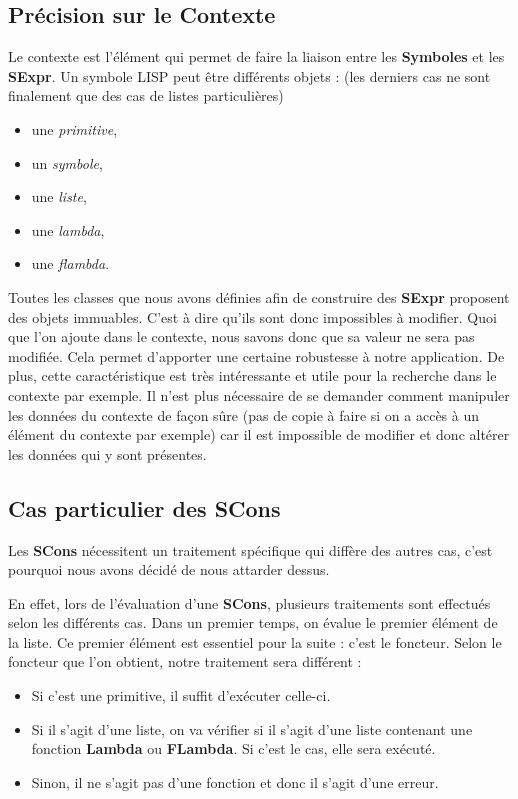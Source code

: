 \documentclass[a4paper, 11pt]{article}
\numberwithin{equation}{section}
\theoremstyle{definition}
\begin{document}
\subsection{Précision sur le Contexte}

Le contexte est l'élément qui permet de faire la liaison entre les {\bfseries Symboles} et les {\bfseries SExpr}.\newline
Un symbole LISP peut être différents objets : (les derniers cas ne sont finalement que des cas de listes particulières)\newline
\begin{itemize}
	\item une \textit{primitive},
	\item un \textit{symbole},
	\item une \textit{liste},
	\item une \textit{lambda},
	\item une \textit{flambda}.
	\newline
\end{itemize}
Toutes les classes que nous avons définies afin de construire des {\bfseries SExpr} proposent des objets immuables. C'est à dire qu'ils sont donc impossibles à modifier. Quoi que l'on ajoute dans le contexte, nous savons donc que sa valeur ne sera pas modifiée. Cela permet d'apporter une certaine robustesse à notre application. De plus, cette caractéristique est très intéressante et utile pour la recherche dans le contexte par exemple. Il n'est plus nécessaire de se demander comment manipuler les données du contexte de façon sûre (pas de copie à faire si on a accès à un élément du contexte par exemple) car il est impossible de modifier et donc altérer les données qui y sont présentes.

\subsection{Cas particulier des SCons}

Les {\bfseries SCons} nécessitent un traitement spécifique qui diffère des autres cas, c'est pourquoi nous avons décidé de nous attarder dessus.

En effet, lors de l'évaluation d'une {\bfseries SCons}, plusieurs traitements sont effectués selon les différents cas. 
Dans un premier temps, on évalue le premier élément de la liste. Ce premier élément est essentiel pour la suite : c'est le foncteur.
Selon le foncteur que l'on obtient, notre traitement sera différent :
\begin{itemize}
	\item Si c'est une primitive, il suffit d'exécuter celle-ci.
	\item Si il s'agit d'une liste, on va vérifier si il s'agit d'une liste contenant une fonction {\bfseries Lambda} ou {\bfseries FLambda}. Si c'est le cas, elle sera exécuté.
	\item Sinon, il ne s'agit pas d'une fonction et donc il s'agit d'une erreur.
	\newline
\end{itemize}
\end{document}
